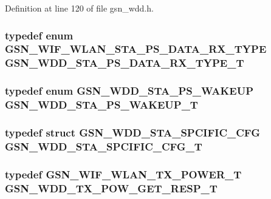 Definition at line 120 of file gsn\_\-wdd.h.

\hypertarget{a00603_a03ed769ea979937a8ce78d802646c729}{
\subsubsection[{GSN\_\-WDD\_\-STA\_\-PS\_\-DATA\_\-RX\_\-TYPE\_\-T}]{\setlength{\rightskip}{0pt plus 5cm}typedef enum {\bf GSN\_\-WIF\_\-WLAN\_\-STA\_\-PS\_\-DATA\_\-RX\_\-TYPE} {\bf GSN\_\-WDD\_\-STA\_\-PS\_\-DATA\_\-RX\_\-TYPE\_\-T}}}
\label{a00603_a03ed769ea979937a8ce78d802646c729}
\hypertarget{a00603_ad4d84331dadc231fd291b26199b36691}{
\subsubsection[{GSN\_\-WDD\_\-STA\_\-PS\_\-WAKEUP\_\-T}]{\setlength{\rightskip}{0pt plus 5cm}typedef enum {\bf GSN\_\-WDD\_\-STA\_\-PS\_\-WAKEUP} {\bf GSN\_\-WDD\_\-STA\_\-PS\_\-WAKEUP\_\-T}}}
\label{a00603_ad4d84331dadc231fd291b26199b36691}
\hypertarget{a00603_a8191aefa707f0e98b4e0ea3b6030ce5e}{
\subsubsection[{GSN\_\-WDD\_\-STA\_\-SPCIFIC\_\-CFG\_\-T}]{\setlength{\rightskip}{0pt plus 5cm}typedef struct {\bf GSN\_\-WDD\_\-STA\_\-SPCIFIC\_\-CFG} {\bf GSN\_\-WDD\_\-STA\_\-SPCIFIC\_\-CFG\_\-T}}}
\label{a00603_a8191aefa707f0e98b4e0ea3b6030ce5e}
\hypertarget{a00603_a18054aae33f811d29ce76060bf51e0f4}{
\subsubsection[{GSN\_\-WDD\_\-TX\_\-POW\_\-GET\_\-RESP\_\-T}]{\setlength{\rightskip}{0pt plus 5cm}typedef {\bf GSN\_\-WIF\_\-WLAN\_\-TX\_\-POWER\_\-T} {\bf GSN\_\-WDD\_\-TX\_\-POW\_\-GET\_\-RESP\_\-T}}}
\label{a00603_a18054aae33f811d29ce76060bf51e0f4}


